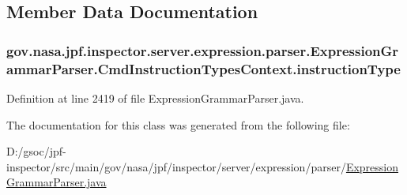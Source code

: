 \subsection{Member Data Documentation}
\subsubsection[{\texorpdfstring{instruction\+Type}{instructionType}}]{ gov.\+nasa.\+jpf.\+inspector.\+server.\+expression.\+parser.\+Expression\+Grammar\+Parser.\+Cmd\+Instruction\+Types\+Context.\+instruction\+Type}\hypertarget{classgov_1_1nasa_1_1jpf_1_1inspector_1_1server_1_1expression_1_1parser_1_1_expression_grammar_pab3186941420d0c466c6d856eeff6b665_a5c492cf329994a1aac620e84cf15390f}{}\label{classgov_1_1nasa_1_1jpf_1_1inspector_1_1server_1_1expression_1_1parser_1_1_expression_grammar_pab3186941420d0c466c6d856eeff6b665_a5c492cf329994a1aac620e84cf15390f}


Definition at line 2419 of file Expression\+Grammar\+Parser.\+java.



The documentation for this class was generated from the following file\+:\begin{DoxyCompactItemize}
\item 
D\+:/gsoc/jpf-\/inspector/src/main/gov/nasa/jpf/inspector/server/expression/parser/\hyperlink{_expression_grammar_parser_8java}{Expression\+Grammar\+Parser.\+java}\end{DoxyCompactItemize}
